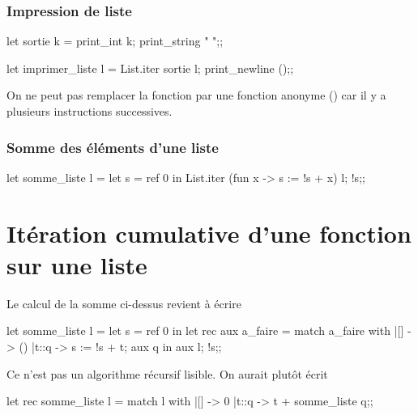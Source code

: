 \subsubsection{Impression de liste}

\begin{ocaml}
let sortie k =
   print_int k;
   print_string " ";;

let imprimer_liste l = 
    List.iter sortie l;
    print_newline ();;
\end{ocaml} 
On ne peut pas remplacer la fonction  par une fonction anonyme () car il y a plusieurs instructions successives.
\subsubsection{Somme des éléments d'une liste}
\begin{ocaml}
let somme_liste l =
   let s = ref 0 in
   List.iter (fun x -> s := !s + x) l;
   !s;;
\end{ocaml} 
\newpage
\section{Itération cumulative d'une fonction sur une liste}
Le calcul de la somme ci-dessus revient à écrire
\begin{ocaml}
let somme_liste l =
   let s = ref 0 in
   let rec aux a_faire =
      match a_faire with
      |[] -> ()
      |t::q -> s := !s + t;
               aux q in
   aux l;
   !s;;
\end{ocaml} 
Ce n'est pas un algorithme récursif lisible.
On aurait plutôt écrit
\begin{ocaml}
let rec somme_liste l =
   match l with
   |[] -> 0
   |t::q -> t + somme_liste q;;
\end{ocaml} 

